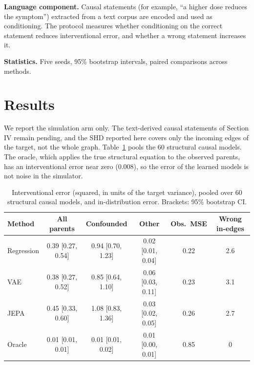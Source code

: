 \documentclass[conference]{IEEEtran}
\begin{document}
\textbf{Language component.} Causal statements (for example, ``a higher dose reduces the symptom'') extracted from a text corpus are encoded and used as conditioning. The protocol measures whether conditioning on the correct statement reduces interventional error, and whether a wrong statement increases it.

\textbf{Statistics.} Five seeds, 95\% bootstrap intervals, paired comparisons across methods.

\section{Results}
We report the simulation arm only. The text-derived causal statements of Section IV remain pending, and the SHD reported here covers only the incoming edges of the target, not the whole graph. Table~\ref{tab:causal} pools the 60 structural causal models. The oracle, which applies the true structural equation to the observed parents, has an interventional error near zero (0.008), so the error of the learned models is not noise in the simulator.

\begin{table}[!t]
\caption{Interventional error (squared, in units of the target variance), pooled over 60 structural causal models, and in-distribution error. Brackets: 95\% bootstrap CI.}
\label{tab:causal}
\centering
\small
\small
\begin{tabular}{lccccc}
\hline
Method & All parents & Confounded & Other & Obs.\ MSE & Wrong in-edges \\
\hline
Regression & 0.39 [0.27, 0.54] & 0.94 [0.70, 1.23] & 0.02 [0.01, 0.04] & 0.22 & 2.6 \\
VAE & 0.38 [0.27, 0.52] & 0.85 [0.64, 1.10] & 0.06 [0.03, 0.11] & 0.23 & 3.1 \\
JEPA & 0.45 [0.33, 0.60] & 1.08 [0.83, 1.36] & 0.03 [0.02, 0.05] & 0.26 & 2.7 \\
Oracle & 0.01 [0.01, 0.01] & 0.01 [0.01, 0.02] & 0.01 [0.00, 0.01] & 0.85 & 0 \\
\hline
\end{tabular}
\end{table}
\end{document}
